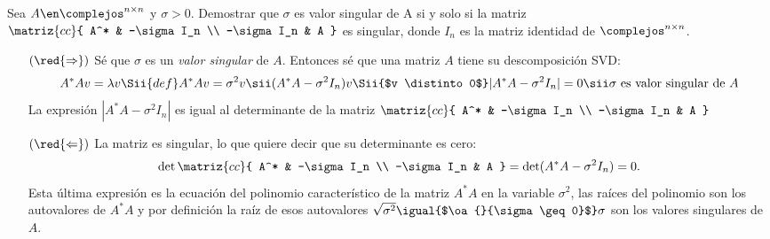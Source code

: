 \begin{enunciado}{\ejercicio}
  Sea $A \en \complejos^{n \times n}$ y $\sigma > 0$. Demostrar que $\sigma$ es valor singular de A
  si y solo si la matriz
  $\matriz{cc}{
      A^* & -\sigma I_n \\
      -\sigma I_n & A
    }$
  es singular, donde $I_n$ es la matriz identidad de $\complejos^{n \times n}$.
\end{enunciado}

\begin{itemize}
  \item[$(\red{\Rightarrow})$] Sé que $\sigma$ es un \textit{valor singular} de $A$.
        Entonces sé que una matriz $A$ tiene su descomposición SVD:
        $$
          A^*A v = \lambda v
          \Sii{def}
          A^*A v = \sigma^2 v
          \sii
          (A^*A - \sigma^2 I_n) v
          \Sii{$v \distinto 0$}
          |A^*A - \sigma^2 I_n| = 0
          \sii \sigma \text{ es valor singular de } A
        $$
        La expresión $|A^*A - \sigma^2 I_n|$ es igual al determinante de la matriz
        $\matriz{cc}{
            A^* & -\sigma I_n \\
            -\sigma I_n & A
          }$

  \item[$(\red{\Leftarrow})$]
        La matriz es singular, lo que quiere decir que su determinante es cero:
        $$
          \det
          \matriz{cc}{
            A^* & -\sigma I_n \\
            -\sigma I_n & A
          } =
          \det(A^*A - \sigma^2I_n) = 0.
        $$
        Esta última expresión es la ecuación del polinomio característico de la matriz $A^*A$ en la variable $\sigma^2$,
        las raíces del polinomio son los autovalores de $A^*A$ y por definición la raíz de esos autovalores
        $\sqrt{\sigma^2} \igual{$\oa{}{\sigma \geq 0}$} \sigma$ son los valores singulares de $A$.
\end{itemize}

\begin{aportes}
  \item {}
\end{aportes}

